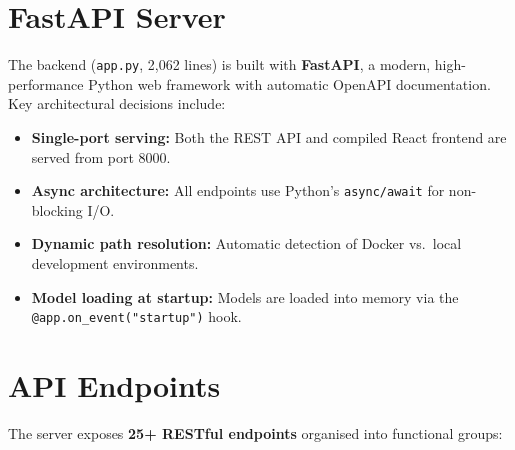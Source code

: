 \documentclass[12pt, a4paper]{report}
\begin{document}
\section{FastAPI Server}

The backend (\texttt{app.py}, 2,062 lines) is built with \textbf{FastAPI}, a modern, high-performance Python web framework with automatic OpenAPI documentation. Key architectural decisions include:

\begin{itemize}
    \item \textbf{Single-port serving:} Both the REST API and compiled React frontend are served from port 8000.
    \item \textbf{Async architecture:} All endpoints use Python's \texttt{async/await} for non-blocking I/O.
    \item \textbf{Dynamic path resolution:} Automatic detection of Docker vs.\ local development environments.
    \item \textbf{Model loading at startup:} Models are loaded into memory via the \texttt{@app.on\_event("startup")} hook.
\end{itemize}

\section{API Endpoints}

The server exposes \textbf{25+ RESTful endpoints} organised into functional groups:
\end{document}
